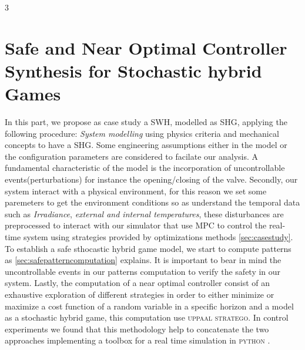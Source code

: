 3\chapter{Safe and Near Optimal Controller Synthesis for Stochastic hybrid Games}
  \label{ch:proposal} %
  In this part, we propose as case study a \ac{SWH}, modelled as 
  \ac{SHG}, applying the following procedure:
  \emph{System modelling} using physics criteria \cite{tsilingiris1996solar} and
  mechanical concepts to have a \ac{SHG}. Some engineering 
  assumptions either in the model or
  the configuration parameters are considered to facilate our analysis.
  A fundamental characteristic  of the model is the incorporation 
  of uncontrollable events(perturbations) for instance the opening/closing of the valve.
  Secondly, our system interact with a physical environment, for this reason 
  we set some paremeters to get the environment conditions so as 
  understand the temporal data such as \emph{Irradiance}, \emph{external and 
  internal temperatures}, these disturbances are preprocessed to interact
  with our simulator that use \ac{MPC} to control the real-time system 
  using strategies provided by optimizations methods \autoref{sec:casestudy}. 
  To establish a safe sthocastic hybrid game model, we start to compute patterns as
  \autoref{sec:safepatterncomputation} explains. It is important to bear in mind
  the uncontrollable events in our patterns computation to verify the safety
  in our system.
  Lastly, the computation of a near optimal controller consist of an 
  exhaustive exploration of different strategies in order to either
  minimize or maximize a cost function of a random variable in a 
  specific horizon and a model as a stochastic hybrid game, this 
  computation use \textsc{uppaal stratego}. In control experiments 
  we found that this methodology help to concatenate the two 
  approaches implementing a toolbox for a real time simulation in 
  \textsc{python} \cite{larsen2016online}.
  \clearpage
